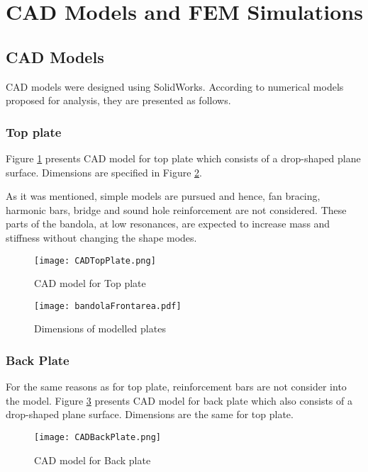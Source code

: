 \section{CAD Models and FEM Simulations}

\subsection{CAD Models}

CAD models were designed using SolidWorks\textsuperscript{\textregistered}. According to numerical models proposed for analysis, they are presented as follows.

\subsubsection{Top plate}

Figure \ref{CADTopPlate} presents CAD model for top plate which consists of a drop-shaped plane surface. Dimensions are specified in Figure \ref{PlateDimensions}.

As it was mentioned, simple models are pursued and hence, fan bracing, harmonic bars, bridge and sound hole reinforcement are not considered. These parts of the bandola, at low resonances, are expected to increase mass and stiffness without changing the shape modes.

\begin{figure}[h]
\centering
\texttt{[image: CADTopPlate.png]}
\caption{CAD model for Top plate}
\label{CADTopPlate}
\end{figure}

\begin{figure}[h]
\centering
\texttt{[image: bandolaFrontarea.pdf]}
\caption{Dimensions of modelled plates}
\label{PlateDimensions}
\end{figure}

\subsubsection{Back Plate}

For the same reasons as for top plate, reinforcement bars are not consider into the model. Figure \ref{CADBackPlate} presents CAD model for back plate which also consists of a drop-shaped plane surface. Dimensions are the same for top plate. 

\begin{figure}[h]
\centering
\texttt{[image: CADBackPlate.png]}
\caption{CAD model for Back plate}
\label{CADBackPlate}
\end{figure}

